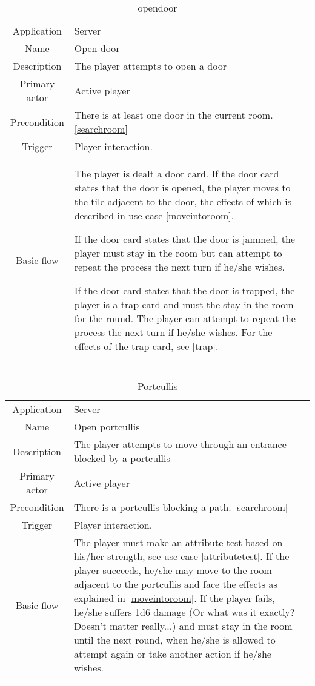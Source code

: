 \documentclass[a4paper,10pt]{report}
\begin{document}
\begin{table}
\caption{opendoor}
\label{opendoor}
\begin{tabular}{|c| p{9cm}|c}
\hline
Application & Server & \\
Name & Open door & \\
Description & The player attempts to open a door & \\
Primary actor & Active player & \\
Precondition & There is at least one door in the current room. \ref{searchroom} & \\
Trigger & Player interaction.  & \\ \hline
Basic flow & The player is dealt a door card. If the door card states that the door is opened, the player moves to the tile adjacent to the door, the effects of which is described in use case \ref{moveintoroom}.

If the door card states that the door is jammed, the player must stay in the room but can attempt to repeat the process the next turn if he/she wishes.

If the door card states that the door is trapped, the player is a trap card and must the stay in the room for the round. The player can attempt to repeat the process the next turn if he/she wishes. For the effects of the trap card, see \ref{trap}. & \\ \hline
 \\
\hline
\end{tabular}
\end{table}

\begin{table}
\caption{Portcullis}
\label{portcullis}
\begin{tabular}{|c| p{9cm}|c}
\hline
Application & Server & \\
Name & Open portcullis & \\
Description & The player attempts to move through an entrance blocked by a portcullis & \\
Primary actor & Active player & \\
Precondition & There is a portcullis blocking a path. \ref{searchroom} & \\
Trigger & Player interaction. & \\ \hline
Basic flow & The player must make an attribute test based on his/her strength, see use case \ref{attributetest}. If the player succeeds, he/she may move to the room adjacent to the portcullis and face the effects as explained in \ref{moveintoroom}. If the player fails, he/she suffers 1d6 damage (Or what was it exactly? Doesn't matter really...) and must stay in the room until the next round, when he/she is allowed to attempt again or take another action if he/she wishes. & \\ \hline
 \\
\hline
\end{tabular}
\end{table}
\end{document}

